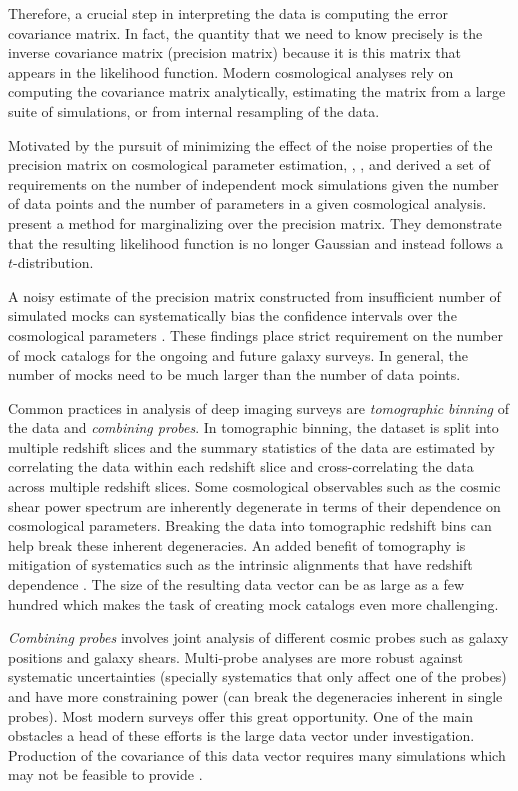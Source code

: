 Therefore, a crucial step in interpreting the data is computing the error covariance matrix. 
In fact, the quantity that we need to know precisely is the inverse covariance matrix (precision matrix) because it is this matrix that appears in the likelihood function. Modern cosmological analyses rely on computing the covariance matrix analytically, estimating the matrix from a large suite of simulations, or from internal resampling of the data. 

Motivated by the pursuit of minimizing the effect of the noise properties of the precision matrix on 
cosmological parameter estimation, \citet{dodelson2013}, \citet{taylor2013}, and \citet{taylor2014} derived a set of requirements 
on the number of independent mock simulations given the number of data points and the number of parameters 
in a given cosmological analysis. \citet{Sellentin:2016a} present a method for marginalizing over the precision matrix. They demonstrate that the 
resulting likelihood function is no longer Gaussian and instead follows a $t$-distribution.

A noisy estimate of the precision matrix 
constructed from insufficient number of simulated mocks can systematically bias the confidence 
intervals over the cosmological parameters \citep{dodelson2013,Sellentin:2017a}. These findings place strict requirement on the number of 
mock catalogs for the ongoing and future galaxy surveys. In general, the number of mocks need to be much larger than 
the number of data points.

Common practices in analysis of deep imaging surveys are \emph{tomographic} \emph{binning} of the data and \emph{combining probes}.
In tomographic binning, the dataset is split into multiple redshift slices and the summary statistics of 
the data are estimated by correlating the data within each redshift slice and cross-correlating the data across 
multiple redshift slices. Some cosmological observables such as the cosmic shear power spectrum are inherently degenerate in terms 
of their dependence on cosmological parameters. Breaking the data into tomographic redshift bins can help break these inherent degeneracies.
An added benefit of tomography is mitigation of systematics such as the intrinsic alignments that have redshift dependence \citep{eifler2015,krause2016}. 
The size of the resulting data vector can be as large as a few hundred which makes the task of creating mock catalogs even more challenging. 

\emph{Combining probes} involves joint analysis of different cosmic probes such as galaxy 
positions and galaxy shears. Multi-probe analyses are more robust against systematic 
uncertainties (specially systematics that only affect one of the probes) 
and have more constraining power (can break the degeneracies inherent in single probes). 
Most modern surveys offer this great opportunity. 
One of the main obstacles a head of these efforts is the large data vector under investigation. 
Production of the covariance of this data vector requires many simulations which may not 
be feasible to provide \citep{eifler2015,schaan,krause2016,kwan2017}.   

